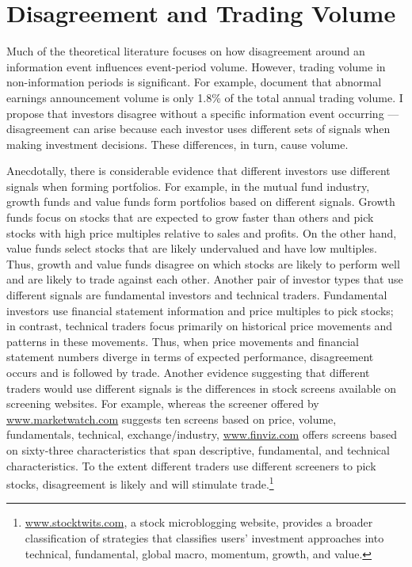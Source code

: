 \documentclass[
  12pt,
  a4paper,
  twoside,
  onecolumn]{article}
\begin{document}
\hypertarget{sec:disagree_and_vol}{%
\section{Disagreement and Trading Volume}\label{sec:disagree_and_vol}}

Much of the theoretical literature focuses on how disagreement around an
information event influences event-period volume. However, trading
volume in non-information periods is significant. For example,
\cite{ball_shiva_2008} document that abnormal earnings announcement
volume is only 1.8\% of the total annual trading volume. I propose that
investors disagree without a specific information event occurring ---
disagreement can arise because each investor uses different sets of
signals when making investment decisions. These differences, in turn,
cause volume.

Anecdotally, there is considerable evidence that different investors use
different signals when forming portfolios. For example, in the mutual
fund industry, growth funds and value funds form portfolios based on
different signals. Growth funds focus on stocks that are expected to
grow faster than others and pick stocks with high price multiples
relative to sales and profits. On the other hand, value funds select
stocks that are likely undervalued and have low multiples. Thus, growth
and value funds disagree on which stocks are likely to perform well and
are likely to trade against each other. Another pair of investor types
that use different signals are fundamental investors and technical
traders. Fundamental investors use financial statement information and
price multiples to pick stocks; in contrast, technical traders focus
primarily on historical price movements and patterns in these movements.
Thus, when price movements and financial statement numbers diverge in
terms of expected performance, disagreement occurs and is followed by
trade. Another evidence suggesting that different traders would use
different signals is the differences in stock screens available on
screening websites. For example, whereas the screener offered by
\url{www.marketwatch.com} suggests ten screens based on price, volume,
fundamentals, technical, exchange/industry, \url{www.finviz.com} offers
screens based on sixty-three characteristics that span descriptive,
fundamental, and technical characteristics. To the extent different
traders use different screeners to pick stocks, disagreement is likely
and will stimulate trade.\footnote{\url{www.stocktwits.com}, a stock
  microblogging website, provides a broader classification of strategies
  that classifies users' investment approaches into technical,
  fundamental, global macro, momentum, growth, and value.}
\end{document}
